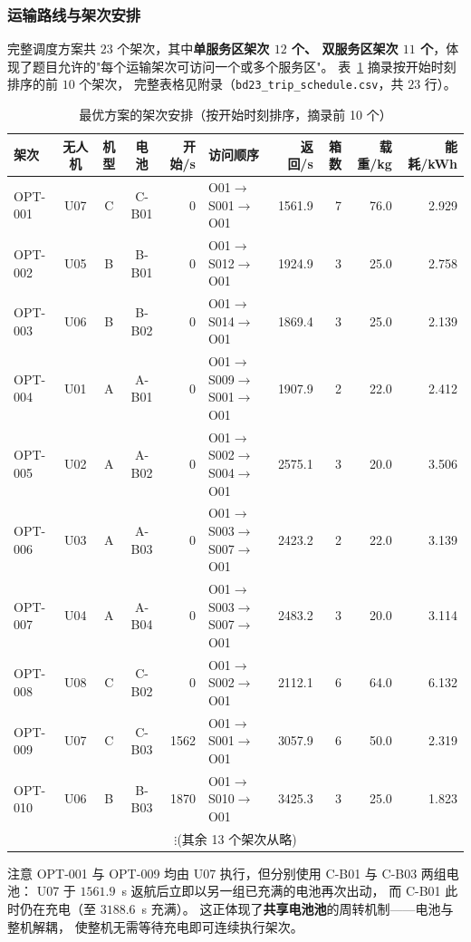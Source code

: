 \subsubsection{运输路线与架次安排}

完整调度方案共 $23$ 个架次，其中\textbf{单服务区架次 $12$ 个、
双服务区架次 $11$ 个}，体现了题目允许的"每个运输架次可访问一个或多个服务区"。
表~\ref{tab:q2-sched} 摘录按开始时刻排序的前 $10$ 个架次，
完整表格见附录（\texttt{bd23\_trip\_schedule.csv}，共 $23$ 行）。

\begin{table}[htbp]
  \centering
  \small
  \caption{最优方案的架次安排（按开始时刻排序，摘录前 10 个）}
  \label{tab:q2-sched}
  \setlength{\tabcolsep}{3.2pt}
  \begin{tabular}{lcccrlrrrr}
    \toprule
    架次 & 无人机 & 机型 & 电池 & 开始/s & 访问顺序 & 返回/s
      & 箱数 & 载重/kg & 能耗/kWh \\
    \midrule
    OPT-001 & U07 & C & C-B01 & 0 & O01$\to$S001$\to$O01 & 1561.9 & 7 & 76.0 & 2.929 \\
    OPT-002 & U05 & B & B-B01 & 0 & O01$\to$S012$\to$O01 & 1924.9 & 3 & 25.0 & 2.758 \\
    OPT-003 & U06 & B & B-B02 & 0 & O01$\to$S014$\to$O01 & 1869.4 & 3 & 25.0 & 2.139 \\
    OPT-004 & U01 & A & A-B01 & 0 & O01$\to$S009$\to$S001$\to$O01 & 1907.9 & 2 & 22.0 & 2.412 \\
    OPT-005 & U02 & A & A-B02 & 0 & O01$\to$S002$\to$S004$\to$O01 & 2575.1 & 3 & 20.0 & 3.506 \\
    OPT-006 & U03 & A & A-B03 & 0 & O01$\to$S003$\to$S007$\to$O01 & 2423.2 & 2 & 22.0 & 3.139 \\
    OPT-007 & U04 & A & A-B04 & 0 & O01$\to$S003$\to$S007$\to$O01 & 2483.2 & 3 & 20.0 & 3.114 \\
    OPT-008 & U08 & C & C-B02 & 0 & O01$\to$S002$\to$O01 & 2112.1 & 6 & 64.0 & 6.132 \\
    OPT-009 & U07 & C & C-B03 & 1562 & O01$\to$S001$\to$O01 & 3057.9 & 6 & 50.0 & 2.319 \\
    OPT-010 & U06 & B & B-B03 & 1870 & O01$\to$S010$\to$O01 & 3425.3 & 3 & 25.0 & 1.823 \\
    \multicolumn{10}{c}{$\vdots$\qquad(其余 13 个架次从略)} \\
    \bottomrule
  \end{tabular}
\end{table}

注意 OPT-001 与 OPT-009 均由 U07 执行，但分别使用 C-B01 与 C-B03 两组电池：
U07 于 $1561.9$~s 返航后立即以另一组已充满的电池再次出动，
而 C-B01 此时仍在充电（至 $3188.6$~s 充满）。
这正体现了\textbf{共享电池池}的周转机制——电池与整机解耦，
使整机无需等待充电即可连续执行架次。

